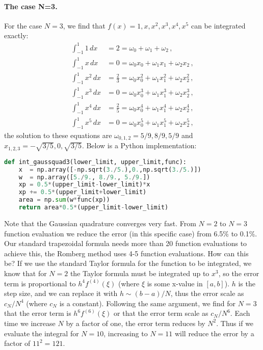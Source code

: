 \documentclass[graybox,sectrefs,envcountresetchap,open=right,final]{svmonodo}
\begin{document}
\paragraph{The case N=3.}
For the case $N=3$, we find that $f(x)=1,x,x^2,x^3,x^4,x^5$ can be integrated exactly:
\begin{align}
\int_{-1}^{1}1\,dx&=2=\omega_0+\omega_1+\omega_2\,,\\ 
\int_{-1}^{1}x\,dx&=0=\omega_0x_0+\omega_1x_1+\omega_2x_2\,,\\ 
\int_{-1}^{1}x^2\,dx&=\frac{2}{3}=\omega_0x_0^2+\omega_1x_1^2+\omega_2x_2^2\,,\\ 
\int_{-1}^{1}x^3\,dx&=0=\omega_0x_0^3+\omega_1x_1^3+\omega_2x_2^3\,,\\ 
\int_{-1}^{1}x^4\,dx&=\frac{2}{5}=\omega_0x_0^4+\omega_1x_1^4+\omega_2x_2^4\,,\\ 
\int_{-1}^{1}x^5\,dx&=0=\omega_0x_0^5+\omega_1x_1^5+\omega_2x_2^5\,,
\end{align}
the solution to these equations are $\omega_{0,1,2}=5/9, 8/9, 5/9$ and $x_{1,2,3}=-\sqrt{3/5},0,\sqrt{3/5}$. Below is a Python implementation:








\begin{lstlisting}[language=python,style=blue1]
def int_gaussquad3(lower_limit, upper_limit,func):
    x  = np.array([-np.sqrt(3./5.),0.,np.sqrt(3./5.)])
    w  = np.array([5./9., 8./9., 5./9.])
    xp = 0.5*(upper_limit-lower_limit)*x
    xp += 0.5*(upper_limit+lower_limit)
    area = np.sum(w*func(xp))
    return area*0.5*(upper_limit-lower_limit)

\end{lstlisting}


Note that the Gaussian quadrature converges very fast. From $N=2$ to $N=3$ function evaluation we reduce the error (in this specific case) 
from 6.5\% to 0.1\%. Our standard trapezoidal formula needs more than 20 function evaluations to achieve this, the Romberg method uses 4-5 function
evaluations. How can this be? If we use the standard Taylor formula for the function to be integrated, we know that for $N=2$ the Taylor 
formula must be integrated up to $x^3$, so the error term is proportional to $h^4f^{(4)}(\xi)$ (where $\xi$ is some x-value in $[a,b]$). 
$h$ is the step size, and we can replace it with $h\sim (b-a)/N$, thus the error scale as $c_N/N^4$ (where $c_N$ is a constant). 
Following the same argument, we find for $N=3$ that the error term is $h^6f^{(6)}(\xi)$ or that the error term scale as $c_N/N^6$. 
Each time we increase $N$ by a factor of one, the error term reduces by $N^2$. Thus if we evaluate the integral for $N=10$, 
increasing to $N=11$ will reduce the error by a factor of $11^2=121$.
\end{document}
